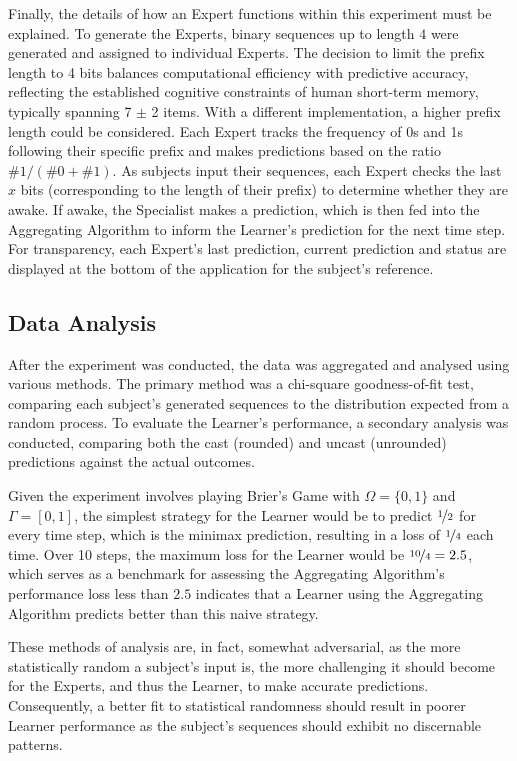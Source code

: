 Finally, the details of how an Expert functions within this experiment must be explained. To generate the Experts, binary sequences up to length $4$ were generated and assigned to individual Experts. The decision to limit the prefix length to 4 bits balances computational efficiency with predictive accuracy, reflecting the established cognitive constraints of human short-term memory, typically spanning 7 $\pm$ 2 items. With a different implementation, a higher prefix length could be considered. Each Expert tracks the frequency of 0s and 1s following their specific prefix and makes predictions based on the ratio $\#1 / (\#0 + \#1)$. As subjects input their sequences, each Expert checks the last $x$ bits (corresponding to the length of their prefix) to determine whether they are awake. If awake, the Specialist makes a prediction, which is then fed into the Aggregating Algorithm to inform the Learner's prediction for the next time step. For transparency, each Expert's last prediction, current prediction and status are displayed at the bottom of the application for the subject's reference.

\subsection{Data Analysis}\label{subsection:data_analysis}
After the experiment was conducted, the data was aggregated and analysed using various methods. The primary method was a chi-square goodness-of-fit test, comparing each subject's generated sequences to the distribution expected from a random process. To evaluate the Learner's performance, a secondary analysis was conducted, comparing both the cast (rounded) and uncast (unrounded) predictions against the actual outcomes.

Given the experiment involves playing Brier's Game with $\Omega = \{0, 1\}$ and $\Gamma = [0, 1]$, the simplest strategy for the Learner would be to predict $\nicefrac{1}{2}$ for every time step, which is the minimax prediction, resulting in a loss of $\nicefrac{1}{4}$ each time. Over 10 steps, the maximum loss for the Learner would be $\nicefrac{10}{4} = 2.5$, which serves as a benchmark for assessing the Aggregating Algorithm's performance \textendash{} loss less than $2.5$ indicates that a Learner using the Aggregating Algorithm predicts better than this naive strategy.

These methods of analysis are, in fact, somewhat adversarial, as the more statistically random a subject's input is, the more challenging it should become for the Experts, and thus the Learner, to make accurate predictions. Consequently, a better fit to statistical randomness should result in poorer Learner performance as the subject's sequences should exhibit no discernable patterns.
\newpage

